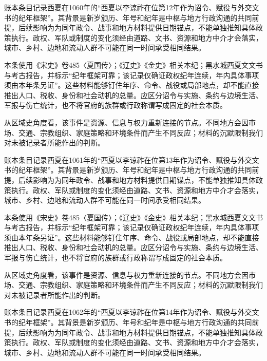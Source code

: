 账本条目记录西夏在1060年的“西夏以李谅祚在位第12年作为诏令、赋役与外交文书的纪年框架”。其背景是新岁颁历、年号和纪年是中枢与地方行政沟通的共同前提，后续影响为为同年政令、战事和地方材料提供日期锚点，不能单独推知具体政策执行。政权、军队或制度的变化须经由道路、文书、资源和地方中介才会落实，城市、乡村、边地和流动人群不可能在同一时间承受相同结果。

本条使用《宋史》卷485〈夏国传〉；《辽史》《金史》相关本纪；黑水城西夏文文书与考古报告，并标示“纪年框架可靠；该记录仅确证政权纪年连续，年内具体事项须由本年条另证”。这些材料能够钉住年序、命令、战役或局部地点，却不能直接推出人口、税收、身份和社会动机的总量。应区分诏令与实施、条约与边境生活、军报与伤亡统计，也不将官府的族群或行政称谓写成固定的社会本质。

从区域史角度看，该事件是资源、信息与权力重新连接的节点。不同地方会因市场、交通、宗教组织、家庭策略和环境条件而产生不同反应；材料的沉默限制我们对未被记录者所能作出的判断。

账本条目记录西夏在1061年的“西夏以李谅祚在位第13年作为诏令、赋役与外交文书的纪年框架”。其背景是新岁颁历、年号和纪年是中枢与地方行政沟通的共同前提，后续影响为为同年政令、战事和地方材料提供日期锚点，不能单独推知具体政策执行。政权、军队或制度的变化须经由道路、文书、资源和地方中介才会落实，城市、乡村、边地和流动人群不可能在同一时间承受相同结果。

本条使用《宋史》卷485〈夏国传〉；《辽史》《金史》相关本纪；黑水城西夏文文书与考古报告，并标示“纪年框架可靠；该记录仅确证政权纪年连续，年内具体事项须由本年条另证”。这些材料能够钉住年序、命令、战役或局部地点，却不能直接推出人口、税收、身份和社会动机的总量。应区分诏令与实施、条约与边境生活、军报与伤亡统计，也不将官府的族群或行政称谓写成固定的社会本质。

从区域史角度看，该事件是资源、信息与权力重新连接的节点。不同地方会因市场、交通、宗教组织、家庭策略和环境条件而产生不同反应；材料的沉默限制我们对未被记录者所能作出的判断。

账本条目记录西夏在1062年的“西夏以李谅祚在位第14年作为诏令、赋役与外交文书的纪年框架”。其背景是新岁颁历、年号和纪年是中枢与地方行政沟通的共同前提，后续影响为为同年政令、战事和地方材料提供日期锚点，不能单独推知具体政策执行。政权、军队或制度的变化须经由道路、文书、资源和地方中介才会落实，城市、乡村、边地和流动人群不可能在同一时间承受相同结果。

